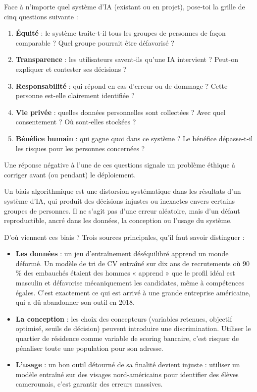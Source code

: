 \documentclass[11pt]{article}
\newcommand{\cle}[1]{{\popxbold\color{popdark}#1}}
\newcounter{popsec}
\newcounter{popsub}
\newcommand{\courssub}[1]{%
  \stepcounter{popsub}%
  \par\vspace{9pt}\noindent{\popxbold\fontsize{11.5}{13}\selectfont\color{popink}{\color{poporange}\thepopsec.\thepopsub}\hspace{6pt}#1}\par\nopagebreak\vspace{4pt}
}
\begin{document}
\begin{methode}
Face à n'importe quel système d'IA (existant ou en projet), pose-toi la grille de cinq questions suivante :
\begin{enumerate}
\item \textbf{Équité} : le système traite-t-il tous les groupes de personnes de façon comparable ? Quel groupe pourrait être défavorisé ?
\item \textbf{Transparence} : les utilisateurs savent-ils qu'une IA intervient ? Peut-on expliquer et contester ses décisions ?
\item \textbf{Responsabilité} : qui répond en cas d'erreur ou de dommage ? Cette personne est-elle clairement identifiée ?
\item \textbf{Vie privée} : quelles données personnelles sont collectées ? Avec quel consentement ? Où sont-elles stockées ?
\item \textbf{Bénéfice humain} : qui gagne quoi dans ce système ? Le bénéfice dépasse-t-il les risques pour les personnes concernées ?
\end{enumerate}
Une réponse négative à l'une de ces questions signale un problème éthique à corriger avant (ou pendant) le déploiement.
\end{methode}

\courssub{Les biais algorithmiques}

\begin{definition}
Un \cle{biais algorithmique} est une distorsion systématique dans les résultats d'un système d'IA, qui produit des décisions injustes ou inexactes envers certains groupes de personnes. Il ne s'agit pas d'une erreur aléatoire, mais d'un défaut reproductible, ancré dans les données, la conception ou l'usage du système.
\end{definition}

D'où viennent ces biais ? Trois sources principales, qu'il faut savoir distinguer :

\begin{itemize}
\item \textbf{Les données} : un jeu d'entraînement déséquilibré apprend un monde déformé. Un modèle de tri de CV entraîné sur dix ans de recrutements où 90\,\% des embauchés étaient des hommes « apprend » que le profil idéal est masculin et défavorise mécaniquement les candidates, même à compétences égales. C'est exactement ce qui est arrivé à une grande entreprise américaine, qui a dû abandonner son outil en 2018.
\item \textbf{La conception} : les choix des concepteurs (variables retenues, objectif optimisé, seuils de décision) peuvent introduire une discrimination. Utiliser le quartier de résidence comme variable de scoring bancaire, c'est risquer de pénaliser toute une population pour son adresse.
\item \textbf{L'usage} : un bon outil détourné de sa finalité devient injuste : utiliser un modèle entraîné sur des visages nord-américains pour identifier des élèves camerounais, c'est garantir des erreurs massives.
\end{itemize}
\end{document}
